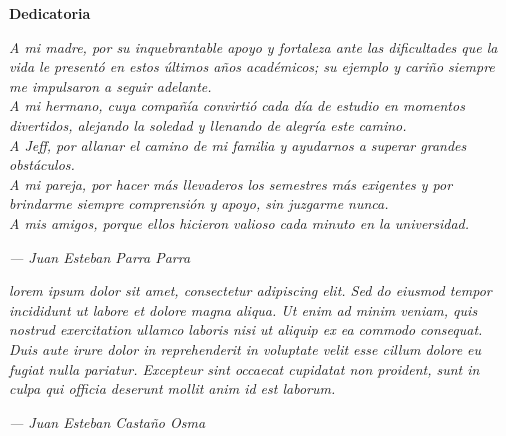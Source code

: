 \cleardoublepage%
%
\thispagestyle{empty}

\vspace*{\fill}

\begin{center}
	{\Large\bfseries Dedicatoria}
\end{center}

\vspace{2cm}

\begin{center}
	\textit{
		A mi madre, por su inquebrantable apoyo y fortaleza ante las dificultades que la vida le presentó en estos últimos años académicos; su ejemplo y cariño siempre me impulsaron a seguir adelante.\\
		A mi hermano, cuya compañía convirtió cada día de estudio en momentos divertidos, alejando la soledad y llenando de alegría este camino.\\
		A Jeff, por allanar el camino de mi familia y ayudarnos a superar grandes obstáculos.\\
		A mi pareja, por hacer más llevaderos los semestres más exigentes y por brindarme siempre comprensión y apoyo, sin juzgarme nunca.\\
		A mis amigos, porque ellos hicieron valioso cada minuto en la universidad.
	}
	\vspace{2cm}

	\hfill \textit{--- Juan Esteban Parra Parra}

	\vspace{3cm}

	\textit{
		lorem ipsum dolor sit amet, consectetur adipiscing elit. Sed do eiusmod tempor incididunt ut labore et dolore magna aliqua. Ut enim ad minim veniam, quis nostrud exercitation ullamco laboris nisi ut aliquip ex ea commodo consequat. Duis aute irure dolor in reprehenderit in voluptate velit esse cillum dolore eu fugiat nulla pariatur. Excepteur sint occaecat cupidatat non proident, sunt in culpa qui officia deserunt mollit anim id est laborum.
	}

	\vspace{2cm}

	\hfill \textit{--- Juan Esteban Castaño Osma}
\end{center}

